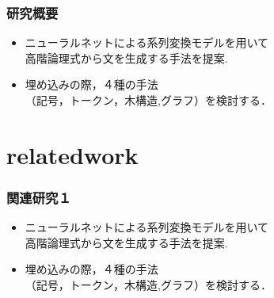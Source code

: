 \documentclass[dvipdfmx]{beamer}
\begin{document}
\begin{frame}
\frametitle{研究概要}
\begin{center}
\end{center}
\begin{block}{}
  \begin{itemize}
    \item ニューラルネットによる系列変換モデルを用いて\\高階論理式から文を生成する手法を提案.
    \item 埋め込みの際，４種の手法\\（記号，トークン，木構造,グラフ）を検討する．
  \end{itemize}
\end{block}

\end{frame}


\section{relatedwork}
\begin{frame}
\frametitle{関連研究１}
\begin{center}
\end{center}
\begin{block}{}
  \begin{itemize}
    \item ニューラルネットによる系列変換モデルを用いて\\{\color{berry}高階論理式}から文を生成する手法を提案.
    \item 埋め込みの際，４種の手法\\（記号，トークン，木構造,グラフ）を検討する．
  \end{itemize}
\end{block}

\end{frame}
\end{document}
